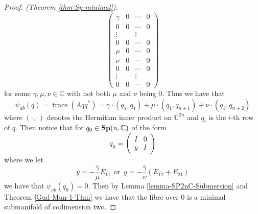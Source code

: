 \documentclass[11pt,reqno]{amsart}
\theoremstyle{plain}
\theoremstyle{definition}
\numberwithin{equation}{section}
\def \cn{{\mathbb C}}
\def \SpC#1{\text{\bf Sp}(#1,\cn)}
\DeclareMathOperator{\trace}{trace}
\numberwithin{equation}{section}
\begin{document}
\begin{proof}[Proof. (Theorem \ref{thm-Sp-minimal})]
$$ \begin{pmatrix}
\gamma & 0 & \cdots & 0 \\
0 & 0 & \cdots & 0 \\
\vdots & & \vdots &\\
0 & 0 & \cdots & 0 \\
\mu & 0 & \cdots & 0 \\
\nu & 0 & \cdots & 0 \\
0 & 0 & \cdots & 0 \\
\vdots &  & \vdots & \\
0 & 0 & \cdots & 0 
\end{pmatrix}  $$
for some $\gamma,\mu,\nu \in \cn$ with not both $\mu$ and $\nu$ being $0$. 
Thus we have that
$$\psi_{ab}(q) = \trace(A qq^*) = \gamma \cdot (q_1,q_1)+\mu\cdot(q_1,q_{n+1})+\nu \cdot (q_1,q_{n+2})$$
where $(\cdot,\cdot)$ denotes the Hermitian inner product on $\cn^{2n}$ and $q_i$ is the $i$-th row of $q$.
Then notice that for $q_0 \in \SpC{n}$ of the form
$$ q_0=\begin{pmatrix}
	I & 0 \\
	y & I
\end{pmatrix}$$
where we let $$y= -\frac{\bar \gamma}{\bar \mu}E_{11} \ \  \text{or} \ \  y= - \frac{\bar \gamma}{\bar \nu} (E_{12}+E_{21})$$
we have that $\psi_{ab}(q_0) = 0$. Then by Lemma \ref{lemma-SP2nC-Submersion} and Theorem \ref{Gud-Mun-1-Thm} we have that the fibre over $0$ is a minimal submanifold of codimension two.
\end{proof}










                 
\end{document}
